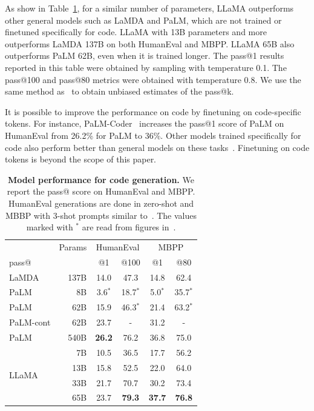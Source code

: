 \documentclass[11pt]{article}
\newcommand{\model}{LLaMA\xspace}
\begin{document}
As show in Table~\ref{tab:code}, for a similar number of parameters, \model outperforms other general models such as LaMDA and PaLM, which are not trained or finetuned specifically for code.
\model with 13B parameters and more outperforms LaMDA 137B on both HumanEval and MBPP. 
\model 65B also outperforms PaLM 62B, even when it is trained longer. 
The pass@1 results reported in this table were obtained by sampling with temperature 0.1. The pass@100 and pass@80 metrics were obtained with temperature 0.8. We use the same method as~\citet{chen2021Evaluating} to obtain unbiased estimates of the pass@k.

It is possible to improve the performance on code by finetuning on code-specific tokens.
For instance, PaLM-Coder~\citep{chowdhery2022palm} increases the pass@1 score of PaLM on HumanEval from 26.2\% for PaLM to 36\%.
Other models trained specifically for code also perform better than general models on these tasks~\citep{chen2021Evaluating,nijkamp2022codegen,fried2022incoder}.
Finetuning on code tokens is beyond the scope of this paper.

\begin{table}[h!]
\setlength{\tabcolsep}{4pt}
\centering
\begin{tabular}{lrcccc}
\toprule
 & Params & \multicolumn{2}{c}{HumanEval} &  \multicolumn{2}{c}{MBPP}\\
pass@ &  & @1 & @100 &  @1 & @80 \\
\midrule
LaMDA & 137B & 14.0 & 47.3 & 14.8 & 62.4\\
PaLM  & 8B & 3.6$^*$  & 18.7$^*$ & 5.0$^*$ & 35.7$^*$\\
PaLM  & 62B & 15.9  & 46.3$^*$ & 21.4 & 63.2$^*$\\
PaLM-cont & 62B & 23.7  & - & 31.2 & -\\
PaLM  & 540B & \textbf{26.2} & 76.2 & 36.8 & 75.0\\
\midrule
\multirow{4}{*}{\model}
                        & 7B    & 10.5 &  36.5 & 17.7 & 56.2\\
                        & 13B   & 15.8 & 52.5 & 22.0 & 64.0\\
                        & 33B   & 21.7 & 70.7 & 30.2 & 73.4\\
                        & 65B   & 23.7  & \textbf{79.3} & \textbf{37.7} & \textbf{76.8}\\
\bottomrule
\end{tabular}
\caption{
\textbf{Model performance for code generation.}
We report the pass@ score on HumanEval and MBPP. HumanEval generations are done in zero-shot and MBBP with 3-shot prompts similar to~\citet{austin2021program}. The values marked with $^*$ are read from figures in~\citet{chowdhery2022palm}.
\label{tab:code}
}
\end{table}
\end{document}
